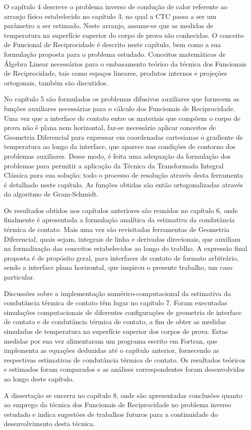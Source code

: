 O capítulo 4 descreve o problema inverso de condução de calor referente ao arranjo físico estabelecido no capítulo 3, no qual a CTC passa a ser um parâmetro a ser estimado. Neste arranjo, assume-se que as medidas de temperatura na superfície superior do corpo de prova são conhecidas. O conceito de Funcional de Reciprocidade é descrito neste capítulo, bem como a sua formulação proposta para o problema estudado. Conceitos matemáticos de Álgebra Linear necessários para o embasamento teórico da técnica dos Funcionais de Reciprocidade, tais como espaços lineares, produtos internos e projeções ortogonais, também são discutidos.

No capítulo 5 são formulados os problemas difusivos auxiliares que fornecem as funções auxiliares necessárias para o cálculo dos Funcionais de Reciprocidade. Uma vez que a interface de contato entre os materiais que compõem o corpo de prova não é plana nem horizontal, faz-se necessário aplicar conceitos de Geometria Diferencial para expressar em coordenadas cartesianas o gradiente de temperatura ao longo da interface, que aparece nas condições de contorno dos problemas auxiliares. Desse modo, é feita uma adequação da formulação dos problemas para permitir a aplicação da Técnica da Transformada Integral Clássica para sua solução; todo o processo de resolução através desta ferramenta é detalhado neste capítulo. As funções obtidas são então ortogonalizadas através do algoritmo de Gram-Schmidt.

Os resultados obtidos nos capítulos anteriores são reunidos no capítulo 6, onde finalmente é apresentada a formulação analítica da estimativa da condutância térmica de contato. Mais uma vez são revisitadas ferramentas de Geometria Diferencial, quais sejam, integrais de linha e derivadas direcionais, que auxiliam na formalização das conceitos estabelecidos ao longo do trablho. A expressão final proposta é de propósito geral, para interfaces de contato de formato arbitrário, sendo a interface plana horizontal, que inspirou o presente trabalho, um caso particular.

Discussões sobre a implementação numérico-computacional da estimativa da condutância térmica de contato têm lugar no capítulo 7. Foram executadas simulações computacionais de diferentes configurações de geometria de interface de contato e de condutância térmica de contato, a fim de obter as medidas simuladas de temperatura na superfície superior dos corpos de prova. Estas medidas por sua vez alimentaram um programa escrito em Fortran, que implementa as equações deduzidas até o capítulo anterior, fornecendo as respectivas estimativas de condutância térmica de contato. Os resultados teóricos e estimados foram comparados e as análises correspondentes foram desenvolvidas ao longo deste capítulo.

A dissertação se encerra no capítulo 8, onde são apresentadas conclusões quanto ao emprego da técnica dos Funcionais de Reciprocidade no problema inverso estudado e indica sugestões de trabalhos futuros para a continuidade do desenvolvimento desta técnica.